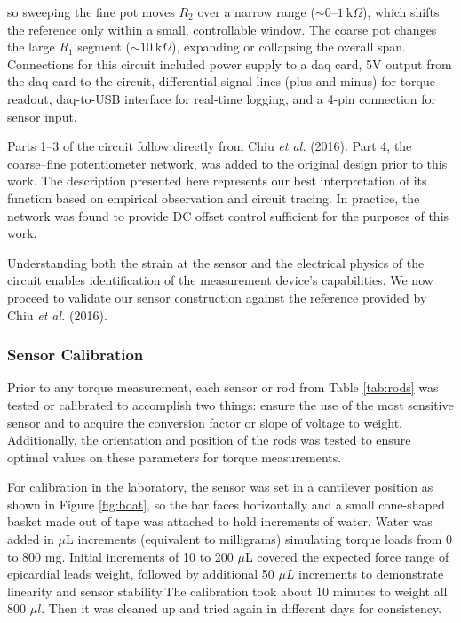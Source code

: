 \noindent so sweeping the fine pot moves \(R_{2}\) over a narrow range (\(\sim 0\)–\(1~\text{k}\Omega\)), which shifts the reference only within a small, controllable window. The coarse pot changes the large \(R_{1}\) segment (\(\sim 10~\text{k}\Omega\)), expanding or collapsing the overall span. Connections for this circuit included power supply to a \gls{daq} card, 5V output from the \gls{daq} card to the circuit, differential signal lines (plus and minus) for torque readout, \gls{daq}-to-USB interface for real-time logging, and a 4-pin connection for sensor input.

Parts 1–3 of the circuit follow directly from Chiu \textit{et al.} (2016)\cite{Chiu2016CharacterizationOA}. Part 4, the coarse–fine potentiometer network, was added to the original design prior to this work. The description presented here represents our best interpretation of its function based on empirical observation and circuit tracing. In practice, the network was found to provide DC offset control sufficient for the purposes of this work.

Understanding both the strain at the sensor and the electrical physics of the circuit enables identification of the measurement device's capabilities. We now proceed to validate our sensor construction against the reference provided by Chiu \textit{et al.} (2016)\cite{Chiu2016CharacterizationOA}.



\subsubsection{Sensor Calibration}
\label{sec:sensorCal}

Prior to any torque measurement, each sensor or rod from Table \ref{tab:rods} was tested or calibrated to accomplish two things: ensure the use of the most sensitive sensor and to acquire the conversion factor or slope of voltage to weight. Additionally, the orientation and position of the rods was tested to ensure optimal values on these parameters for torque measurements.

For calibration in the laboratory, the sensor was set in a cantilever position as shown in Figure \ref{fig:boat}, so the bar faces horizontally and a small cone-shaped basket made out of tape was attached to hold increments of water. Water was added in $\mu$L increments (equivalent to milligrams) simulating torque loads from 0 to 800 mg. Initial increments of 10 to 200 $\mu $L covered the expected force range of epicardial leads weight, followed by additional 50 $\mu L$ increments to demonstrate linearity and sensor stability.The calibration took about 10 minutes to weight all 800 $\mu l$. Then it was cleaned up and tried again in different days for consistency.

